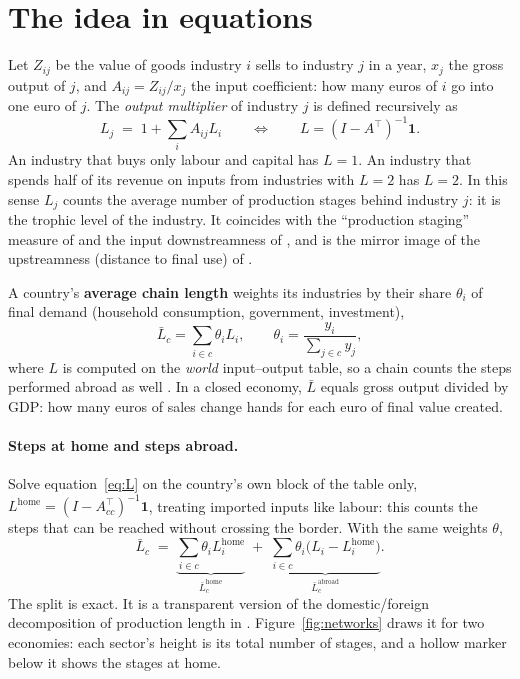 \documentclass[11pt,a4paper]{article}
\newcommand{\Lbar}{\bar L}
\newcommand{\Lhome}{\bar L^{\text{home}}}
\newcommand{\Labroad}{\bar L^{\text{abroad}}}
\begin{document}
\section{The idea in equations}\label{sec:theory}

Let $Z_{ij}$ be the value of goods industry $i$ sells to industry $j$ in a year,
$x_j$ the gross output of $j$, and $A_{ij}=Z_{ij}/x_j$ the input coefficient: how
many euros of $i$ go into one euro of $j$. The \emph{output multiplier} of
industry $j$ is defined recursively as
\begin{equation}
L_j \;=\; 1 + \sum_i A_{ij} L_i
\qquad\Longleftrightarrow\qquad
L = (I - A^\top)^{-1}\mathbf{1}. \label{eq:L}
\end{equation}
An industry that buys only labour and capital has $L=1$. An industry that spends
half of its revenue on inputs from industries with $L=2$ has $L=2$. In this sense
$L_j$ counts the average number of production stages behind industry $j$: it is
the trophic level of the industry. It coincides with the ``production
staging'' measure of \citet{fally2012} and the input downstreamness of
\citet{miller2017}, and is the mirror image of the upstreamness (distance to
final use) of \citet{antras2012}.

A country's \textbf{average chain length} weights its industries by their share
$\theta_i$ of final demand (household consumption, government, investment),
\begin{equation}
\Lbar_c = \sum_{i\in c}\theta_i L_i,\qquad \theta_i = \frac{y_i}{\sum_{j\in c}y_j},
\label{eq:Lbar}
\end{equation}
where $L$ is computed on the \emph{world} input--output table, so a chain counts
the steps performed abroad as well \citep[eq.~5]{mcnerney2022}. In a closed
economy, $\Lbar$ equals gross output divided by GDP: how many euros of sales
change hands for each euro of final value created.

\paragraph{Steps at home and steps abroad.} Solve equation~\eqref{eq:L} on the
country's own block of the table only, $L^{\text{home}}=(I-A_{cc}^\top)^{-1}\mathbf{1}$,
treating imported inputs like labour: this counts the steps that can be reached
without crossing the border. With the same weights $\theta$,
\begin{equation}
\Lbar_c \;=\; \underbrace{\sum_{i\in c}\theta_i L^{\text{home}}_i}_{\Lhome_c}
\;+\; \underbrace{\sum_{i\in c}\theta_i \bigl(L_i - L^{\text{home}}_i\bigr)}_{\Labroad_c}.
\label{eq:split}
\end{equation}
The split is exact. It is a transparent version of the domestic/foreign
decomposition of production length in \citet{wang2017}. Figure~\ref{fig:networks}
draws it for two economies: each sector's height is its total number of stages,
and a hollow marker below it shows the stages at home.
\end{document}
